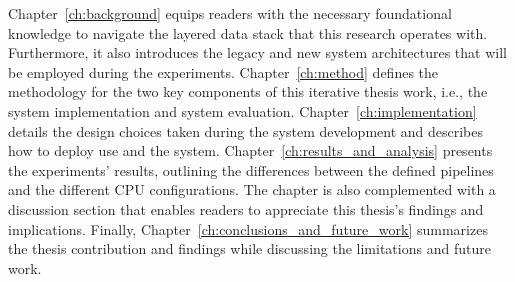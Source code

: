 Chapter~\ref{ch:background} equips readers with the necessary foundational knowledge to navigate the layered data stack that this research operates with. Furthermore, it also introduces the legacy and new system architectures that will be employed during the experiments. Chapter~\ref{ch:method} defines the methodology for the two key components of this iterative thesis work, i.e., the system implementation and system evaluation. Chapter~\ref{ch:implementation} details the design choices taken during the system development and describes how to deploy use and the system.  
Chapter~\ref{ch:results_and_analysis} presents the experiments' results, outlining the differences between the defined pipelines and the different \gls{CPU} configurations. The chapter is also complemented with a discussion section that enables readers to appreciate this thesis's findings and implications. Finally, Chapter~\ref{ch:conclusions_and_future_work} summarizes the thesis contribution and findings while discussing the limitations and future work.